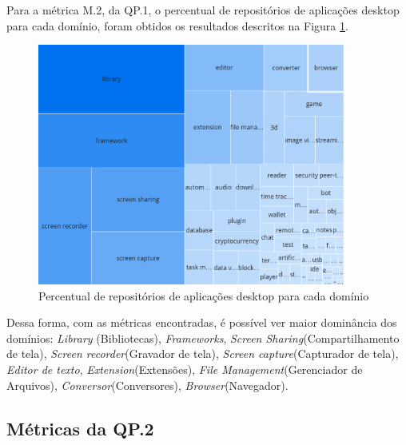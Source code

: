 \documentclass[12pt]{article}
\begin{document}
Para a métrica M.2, da QP.1, o percentual de repositórios de aplicações desktop para cada domínio, foram obtidos os resultados descritos na Figura \ref{fig:Percentual de repositórios por domínio}.
\begin{figure}[H]
    \centering
    \includegraphics[width=0.9\textwidth]{images/dominios map.png}
    \caption{Percentual de repositórios de aplicações desktop para cada domínio}
    \label{fig:Percentual de repositórios por domínio}
\end{figure}
Dessa forma, com as métricas encontradas, é possível ver maior dominância dos domínios: \emph{Library} (Bibliotecas), \emph{Frameworks}, \emph{Screen Sharing}(Compartilhamento de tela), \emph{Screen recorder}(Gravador de tela), \emph{Screen capture}(Capturador de tela), \emph{Editor de texto}, \emph{Extension}(Extensões), \emph{File Management}(Gerenciador de Arquivos), \emph{Conversor}(Conversores), \emph{Browser}(Navegador).

\subsection{Métricas da QP.2}
\end{document}
